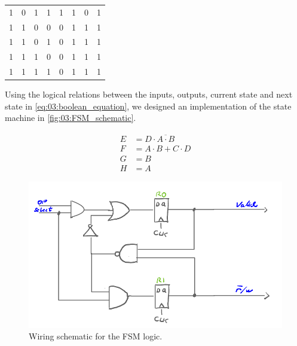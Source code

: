 \begin{table}[H]
\begin{tabular}{|cc|cc|cc|cc|}
        1            & 0            & 1           & 1            & 1              & 1             & 0     & 1                          \\
        1            & 1            & 0           & 0            & 0              & 1             & 1     & 1                          \\
        1            & 1            & 0           & 1            & 0              & 1             & 1     & 1                          \\
        1            & 1            & 1           & 0            & 0              & 1             & 1     & 1                          \\
        1            & 1            & 1           & 1            & 0              & 1             & 1     & 1                          \\ \hline
    \end{tabular}
    \label{tab:03:FSM_truth_table}
\end{table}

Using the logical relations between the inputs, outputs, current state and next state in \autoref{eq:03:boolean_equation}, we designed an implementation of the state machine in \autoref{fig:03:FSM_schematic}. 

\begin{equation}
    \begin{split}
        E   &=  D \cdot \overline{A \cdot B}\\
        F   &=  A \cdot B + C \cdot D       \\
        G   &=  B                           \\
        H   &=  A
    \end{split}
    \label{eq:03:boolean_equation}
\end{equation}

\begin{figure}[H]
    \centering
    \includegraphics[width=0.8\linewidth]{LaTeX_2/Figures/fsm_schematic.png}
    \caption{Wiring schematic for the FSM logic.}
    \label{fig:03:FSM_schematic}
\end{figure}